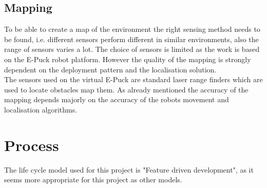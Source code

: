 \subsection{Mapping}
To be able to create a map of the environment the right sensing method needs to be found, i.e. different sensors perform different in similar environments, also the range of sensors varies a lot. 
The choice of sensors is limited as the work is based on the E-Puck robot platform.
However the quality of the mapping is strongly dependent on the deployment pattern and the localisation solution.\\

The sensors used on the virtual E-Puck are standard laser range finders which are used to locate obstacles map them. As already mentioned the accuracy of the mapping depends majorly on the accuracy of the robots movement and localisation algorithms. 

\section{Process}
The life cycle model used for this project is "Feature driven development", as it seems more appropriate for this project as other models. 

